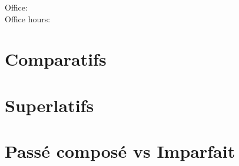 \documentclass{beamer}
\subtitle[Plus-que-parfait et révision]{Le plus-que-parfait et la révision des chapitres 3 et 4}
\begin{document}
  \begin{frame}
    \titlepage
    \tiny{Office: \\
          Office hours: }
  \end{frame}

  
  \begin{frame}
    \hypertarget{début}{}
    \tableofcontents[hideallsubsections]
  \end{frame}

  \section{Comparatifs}
  \section{Superlatifs}
  \section{Passé composé vs Imparfait}
\end{document}
